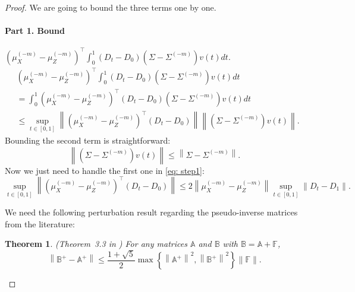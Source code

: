 \documentclass[11pt]{article}
\newtheorem{theorem}{Theorem}[section]
\begin{document}
\begin{proof}
We are going to bound the three terms one by one.
\paragraph{Part 1. Bound} $
\left(\mu_X^{(-m)}-\mu_Z^{(-m)}\right)^{\top} \int_0^1\left(D_t-D_0\right)\left(\Sigma-\Sigma^{(-m)}\right) v(t) d t
$.
\begin{equation}\label{eq: step1}
    \begin{aligned}
      & \left(\mu_X^{(-m)}-\mu_Z^{(-m)}\right)^{\top} \int_0^1\left(D_t-D_0\right)\left(\Sigma-\Sigma^{(-m)}\right) v(t) d t\\
    & = \int_0^1\left(\mu_X^{(-m)}-\mu_Z^{(-m)}\right)^{\top}\left(D_t-D_0\right)\left(\Sigma-\Sigma^{(-m)}\right) v(t) d t \\
    & \leq  \sup _{t \in[0,1]}\left\|\left(\mu_X^{(-m)}-\mu_Z^{(-m)}\right)^{\top}\left(D_t-D_0\right)\right\|\left\|\left(\Sigma-\Sigma^{(-m)}\right) v(t)\right\|.
    \end{aligned}
\end{equation}
Bounding the second term is straightforward:
\begin{equation}\label{eq: step2}
    \left\|\left(\Sigma-\Sigma^{(-m)}\right) v(t)\right\| \leq\left\|\Sigma-\Sigma^{(-m)}\right\| .
\end{equation}
Now we just need to handle the first one in \eqref{eq: step1}:
\begin{equation}\label{eq: diff shows up}
\sup _{t \in[0,1]}\left\|\left(\mu_X^{(-m)}-\mu_Z^{(-m)}\right)^{\top}\left(D_t-D_0\right)\right\| \leq 2\left\|\mu_X^{(-m)}-\mu_Z^{(-m)}\right\| \sup _{t \in[0,1]}\left\|D_t-D_1\right\|.
\end{equation}

We need the following perturbation result regarding the pseudo-inverse matrices from the literature:
\begin{theorem}(Theorem~3.3 in \cite{stewart1977perturbation}) For any matrices $\mathbb{A}$ and $\mathbb{B}$ with $\mathbb{B}=\mathbb{A}+\mathbb{F}$,
\begin{equation}
\left\|\mathbb{B}^{+}-\mathbb{A}^{+}\right\| \leq 
\frac{1+\sqrt{5}}{2}
\max \left\{\left\|\mathbb{A}^{+}\right\|^2,\left\|\mathbb{B}^{+}\right\|^2\right\}\|\mathbb{F}\|.
\end{equation}
\end{theorem}


\end{proof}
\end{document}
